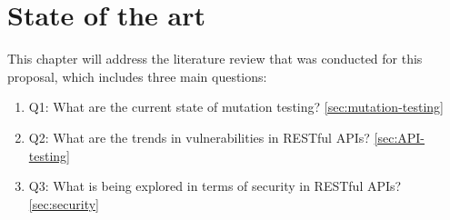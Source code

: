 \chapter{State of the art}

This chapter will address the literature review that was conducted for this proposal, which includes three main questions:
\begin{enumerate}
    \item Q1: What are the current state of mutation testing? \ref{sec:mutation-testing}
    \item Q2: What are the trends in vulnerabilities in RESTful APIs? \ref{sec:API-testing}
    \item Q3: What is being explored in terms of security in RESTful APIs? \ref{sec:security}
\end{enumerate}
